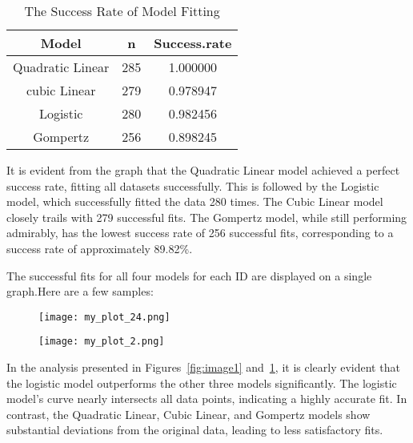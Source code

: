 \documentclass[11pt]{article}
\begin{document}
\begin{table}[H]
\centering
\begin{tabular}{|c|c|c|}
\hline
Model & n & Success.rate \\
\hline
Quadratic Linear & 285 & 1.000000 \\
cubic Linear & 279 & 0.978947 \\
Logistic & 280 & 0.982456\\
Gompertz & 256 &0.898245\\
\hline
\end{tabular}
\caption{The Success Rate of Model Fitting }
\label{tab:1}
\end{table}
It is evident from the graph that the Quadratic Linear model achieved a perfect success rate, fitting all datasets successfully. This is followed by the Logistic model, which successfully fitted the data 280 times. The Cubic Linear model closely trails with 279 successful fits. The Gompertz model, while still performing admirably, has the lowest success rate of 256 successful fits, corresponding to a success rate of approximately 89.82\%.


The successful fits for all four models for each ID are displayed on a single graph.Here are a few samples:
\begin{figure}[H]
  \centering
  \begin{minipage}{0.48\textwidth}
    \texttt{[image: my\_plot\_24.png]}
    \caption{}
    \label{fig:image1}
  \end{minipage}
  \hfill
  \begin{minipage}{0.48\textwidth}
    \texttt{[image: my\_plot\_2.png]}
    \caption{}
    \label{fig:image2}
  \end{minipage}
\end{figure}
In the analysis presented in Figures~\ref{fig:image1} and~\ref{fig:image2}, it is clearly evident that the logistic model outperforms the other three models significantly. The logistic model's curve nearly intersects all data points, indicating a highly accurate fit. In contrast, the Quadratic Linear, Cubic Linear, and Gompertz models show substantial deviations from the original data, leading to less satisfactory fits.
\end{document}
